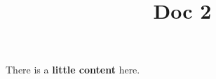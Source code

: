 \documentclass{article}
\begin{document}
\title{Doc 2}

\maketitle


There is a \textbf{little content} here.
\end{document}
